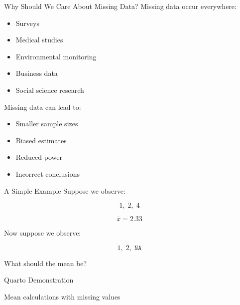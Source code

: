 \documentclass{beamer}
\begin{document}
\begin{frame}{Why Should We Care About Missing Data?}
Missing data occur everywhere:
\begin{itemize}
  \item Surveys
  \item Medical studies
  \item Environmental monitoring
  \item Business data
  \item Social science research
\end{itemize}

\vspace{0.2cm}

Missing data can lead to:
\begin{itemize}
  \item Smaller sample sizes
  \item Biased estimates
  \item Reduced power
  \item Incorrect conclusions
\end{itemize}
\end{frame}

\begin{frame}{A Simple Example}
Suppose we observe:

\[
1,\; 2,\; 4
\]

\[
\bar{x} = 2.33
\]

\vspace{0.4cm}

Now suppose we observe:

\[
1,\; 2,\; \texttt{NA}
\]

\vspace{0.3cm}

\begin{center}
\Large What should the mean be?
\end{center}
\end{frame}

\begin{frame}[plain]
\centering
\vfill
{\Huge Quarto Demonstration}

\vspace{0.5cm}

{\Large Mean calculations with missing values}

\vfill
\end{frame}
\end{document}
